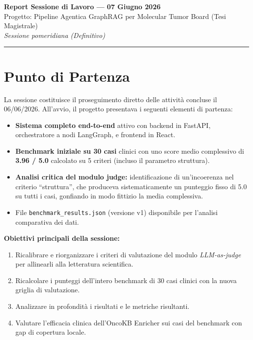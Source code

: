 \documentclass[12pt, a4paper]{article}
\begin{document}
\begin{center}
  {\LARGE\bfseries\color{primaryblue} Report Sessione di Lavoro --- 07 Giugno 2026}\\[0.4em]
  {\large\color{accentblue} Progetto: Pipeline Agentica GraphRAG per Molecular Tumor Board (Tesi Magistrale)}\\[0.2em]
  {\small\color{medgray}\textit{Sessione pomeridiana (Definitivo)}}
\end{center}
\vspace{0.5em}\hrule\vspace{1.2em}

\section{Punto di Partenza}
La sessione costituisce il proseguimento diretto delle attività concluse il 06/06/2026. All'avvio, il progetto presentava i seguenti elementi di partenza:
\begin{itemize}[leftmargin=1.6em, itemsep=3pt]
  \item \textbf{Sistema completo end-to-end} attivo con backend in FastAPI, orchestratore a nodi LangGraph, e frontend in React.
  \item \textbf{Benchmark iniziale su 30 casi} clinici con uno score medio complessivo di \textbf{3.96 / 5.0} calcolato su 5 criteri (incluso il parametro struttura).
  \item \textbf{Analisi critica del modulo judge:} identificazione di un'incoerenza nel criterio ``struttura'', che produceva sistematicamente un punteggio fisso di 5.0 su tutti i casi, gonfiando in modo fittizio la media complessiva.
  \item File \texttt{benchmark\_results.json} (versione v1) disponibile per l'analisi comparativa dei dati.
\end{itemize}

\textbf{Obiettivi principali della sessione:}
\begin{enumerate}[leftmargin=1.6em, itemsep=2pt]
  \item Ricalibrare e riorganizzare i criteri di valutazione del modulo \textit{LLM-as-judge} per allinearli alla letteratura scientifica.
  \item Ricalcolare i punteggi dell'intero benchmark di 30 casi clinici con la nuova griglia di valutazione.
  \item Analizzare in profondità i risultati e le metriche risultanti.
  \item Valutare l'efficacia clinica dell'OncoKB Enricher sui casi del benchmark con gap di copertura locale.
\end{enumerate}
\end{document}
